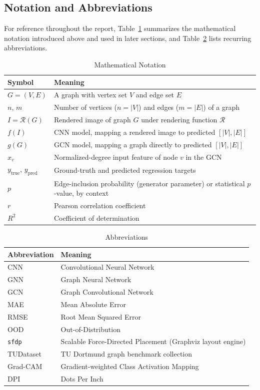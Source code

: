 \documentclass[11pt,letterpaper]{article}
\numberwithin{equation}{section}
\numberwithin{figure}{section}
\numberwithin{table}{section}
\begin{document}
\subsection{Notation and Abbreviations}
\label{sec:notation}
For reference throughout the report, Table~\ref{tab:notation} summarizes the mathematical notation introduced above and used in later sections, and Table~\ref{tab:abbreviations} lists recurring abbreviations.

\begin{table}[htbp]
\centering
\caption{Mathematical Notation}
\label{tab:notation}
\begin{tabular}{ll}
\toprule
Symbol & Meaning \\
\midrule
$G = (V, E)$ & A graph with vertex set $V$ and edge set $E$ \\
$n$, $m$ & Number of vertices ($n = |V|$) and edges ($m = |E|$) of a graph \\
$I = \mathcal{R}(G)$ & Rendered image of graph $G$ under rendering function $\mathcal{R}$ \\
$f(I)$ & CNN model, mapping a rendered image to predicted $[|V|, |E|]$ \\
$g(G)$ & GCN model, mapping a graph directly to predicted $[|V|, |E|]$ \\
$x_v$ & Normalized-degree input feature of node $v$ in the GCN \\
$y_{\text{true}}$, $y_{\text{pred}}$ & Ground-truth and predicted regression targets \\
$p$ & Edge-inclusion probability (generator parameter) or statistical $p$-value, by context \\
$r$ & Pearson correlation coefficient \\
$R^2$ & Coefficient of determination \\
\bottomrule
\end{tabular}
\end{table}

\begin{table}[htbp]
\centering
\caption{Abbreviations}
\label{tab:abbreviations}
\begin{tabular}{ll}
\toprule
Abbreviation & Meaning \\
\midrule
CNN & Convolutional Neural Network \\
GNN & Graph Neural Network \\
GCN & Graph Convolutional Network \\
MAE & Mean Absolute Error \\
RMSE & Root Mean Squared Error \\
OOD & Out-of-Distribution \\
\texttt{sfdp} & Scalable Force-Directed Placement (Graphviz layout engine) \\
TUDataset & TU Dortmund graph benchmark collection \\
Grad-CAM & Gradient-weighted Class Activation Mapping \\
DPI & Dots Per Inch \\
\bottomrule
\end{tabular}
\end{table}
\end{document}
